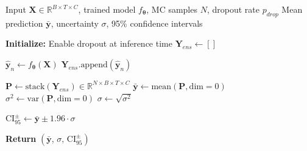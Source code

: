 \begin{algorithm}[H]
\footnotesize
\caption{Monte Carlo Dropout Uncertainty Estimation}
\label{alg:mc_uncertainty}
\begin{algorithmic}
\Require Input $\mathbf{X} \in \mathbb{R}^{B \times T \times C}$, trained model $f_{\boldsymbol{\theta}}$, MC samples $N$, dropout rate $p_{drop}$
\Ensure Mean prediction $\bar{\mathbf{y}}$, uncertainty $\sigma$, 95\% confidence intervals

\State \textbf{Initialize:} Enable dropout at inference time
\State $\mathbf{Y}_{ens} \gets []$ 

    \State $\hat{\mathbf{y}}_n \gets f_{\boldsymbol{\theta}}(\mathbf{X})$ 
    \State $\mathbf{Y}_{ens}.\text{append}(\hat{\mathbf{y}}_n)$
\EndFor

\State $\mathbf{P} \gets \text{stack}(\mathbf{Y}_{ens}) \in \mathbb{R}^{N \times B \times T \times C}$
\State $\bar{\mathbf{y}} \gets \text{mean}(\mathbf{P}, \text{dim}=0)$ 
\State $\sigma^2 \gets \text{var}(\mathbf{P}, \text{dim}=0)$ 
\State $\sigma \gets \sqrt{\sigma^2}$

\State $\text{CI}_{95}^{\pm} \gets \bar{\mathbf{y}} \pm 1.96 \cdot \sigma$ 

\State \textbf{Return} $(\bar{\mathbf{y}},\, \sigma,\, \text{CI}_{95}^{\pm})$
\end{algorithmic}
\end{algorithm}
